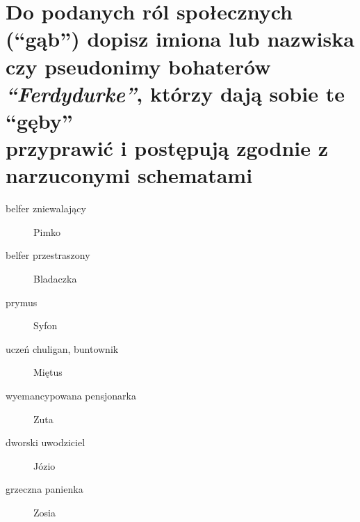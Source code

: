 \documentclass[a4paper]{article}
\begin{document}
\section{Do podanych ról społecznych (``gąb'') dopisz imiona lub nazwiska czy pseudonimy bohate\-rów \emph{``Ferdydurke''}, którzy dają sobie te ``gęby''\\przyprawić i postępują zgodnie z narzuconymi schematami}
\begin{description}
    \item[belfer zniewalający] Pimko
    \item[belfer przestraszony] Bladaczka
    \item[prymus] Syfon
    \item[uczeń chuligan, buntownik] Miętus
    \item[wyemancypowana pensjonarka] Zuta
    \item[dworski uwodziciel] Józio
    \item[grzeczna panienka] Zosia
\end{description}
\end{document}
